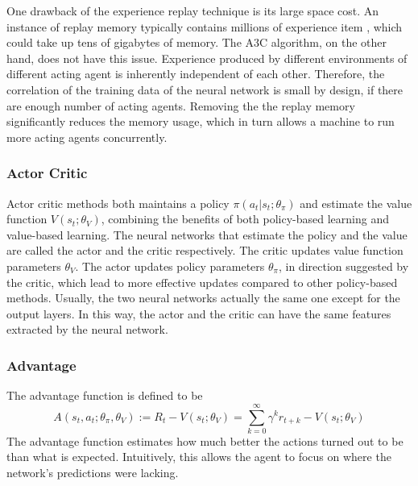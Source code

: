             One drawback of the experience replay technique is its large space cost.
            An instance of replay memory typically contains millions of experience item \cite{mnih_human-level_2015},
            which could take up tens of gigabytes of memory.
            The A3C algorithm, on the other hand, does not have this issue.
            Experience produced by different environments of different acting agent
            is inherently independent of each other.
            Therefore, the correlation of the training data of the neural network is small by design,
            if there are enough number of acting agents.
            Removing the the replay memory significantly reduces the memory usage,
            which in turn allows a machine to run more acting agents concurrently.

        \subsubsection{Actor Critic}

            Actor critic methods both maintains a policy $\pi(a_t|s_t;\theta_{\pi})$ and 
            estimate the value function $V(s_t;\theta_V)$,
            combining the benefits of both policy-based learning and value-based learning.
            The neural networks that estimate the policy and the value are called the actor and the critic respectively.
            The critic updates value function parameters $\theta_V$.
            The actor updates policy parameters $\theta_{\pi}$, in direction suggested by the critic,
            which lead to more effective updates compared to other policy-based methods.
            Usually, the two neural networks actually the same one except for the output layers.
            In this way, the actor and the critic can have the same features extracted by the neural network.

        \subsubsection{Advantage}

            The advantage function is defined to be
            \[
            A(s_t,a_t;\theta_{\pi},\theta_V) := R_t - V(s_t;\theta_V)
            = \sum_{k=0}^{\infty} \gamma^k r_{t+k} - V(s_t;\theta_V)
            \]
            The advantage function estimates how much better the actions turned out to be than what is expected.
            Intuitively, this allows the agent to focus on where the network's predictions were lacking.



